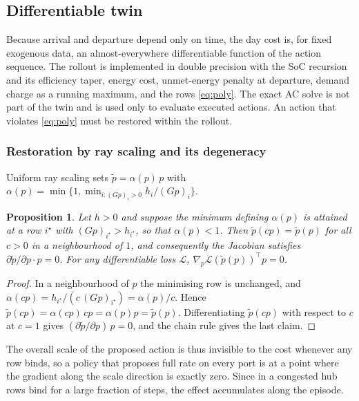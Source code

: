 \documentclass[11pt]{article}
\newtheorem{prop}{Proposition}
\begin{document}
\subsection{Differentiable twin}
Because arrival and departure depend only on time, the day cost is, for fixed exogenous data, an almost-everywhere differentiable function of the action sequence. The rollout is implemented in double precision with the SoC recursion and its efficiency taper, energy cost, unmet-energy penalty at departure, demand charge as a running maximum, and the rows \eqref{eq:poly}. The exact AC solve is not part of the twin and is used only to evaluate executed actions. An action that violates \eqref{eq:poly} must be restored within the rollout.

\subsubsection{Restoration by ray scaling and its degeneracy}
Uniform ray scaling sets $\tilde p=\alpha(p)\,p$ with $\alpha(p)=\min\{1,\min_{i:(Gp)_i>0}h_i/(Gp)_i\}$.
\begin{prop}\label{prop:ray}
Let $h>0$ and suppose the minimum defining $\alpha(p)$ is attained at a row $i^\star$ with $(Gp)_{i^\star}>h_{i^\star}$, so that $\alpha(p)<1$. Then $\tilde p(cp)=\tilde p(p)$ for all $c>0$ in a neighbourhood of $1$, and consequently the Jacobian satisfies $\partial\tilde p/\partial p\cdot p=0$. For any differentiable loss $\mathcal L$, $\nabla_p\mathcal L(\tilde p(p))^\top p=0$.
\end{prop}
\begin{proof}
In a neighbourhood of $p$ the minimising row is unchanged, and $\alpha(cp)=h_{i^\star}/(c\,(Gp)_{i^\star})=\alpha(p)/c$. Hence $\tilde p(cp)=\alpha(cp)\,cp=\alpha(p)p=\tilde p(p)$. Differentiating $\tilde p(cp)$ with respect to $c$ at $c=1$ gives $(\partial\tilde p/\partial p)\,p=0$, and the chain rule gives the last claim.
\end{proof}
The overall scale of the proposed action is thus invisible to the cost whenever any row binds, so a policy that proposes full rate on every port is at a point where the gradient along the scale direction is exactly zero. Since in a congested hub rows bind for a large fraction of steps, the effect accumulates along the episode.
\end{document}
